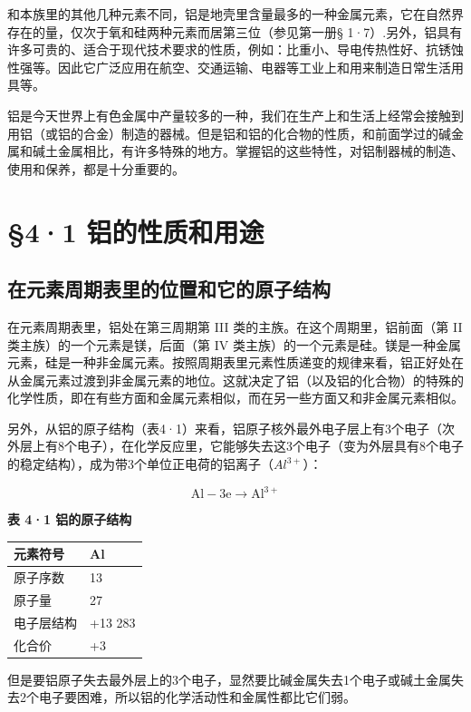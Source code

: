 和本族里的其他几种元素不同，铝是地壳里含量最多的一种金属元素，它在自然界存在的量，仅次于氧和硅两种元素而居第三位（参见第一册§
1·7）.另外，铝具有许多可贵的、适合于现代技术要求的性质，例如：比重小、导电传热性好、抗锈蚀性强等。因此它广泛应用在航空、交通运输、电器等工业上和用来制造日常生活用具等。

铝是今天世界上有色金属中产量较多的一种，我们在生产上和生活上经常会接触到用铝（或铝的合金）制造的器械。但是铝和铝的化合物的性质，和前面学过的碱金属和碱土金属相比，有许多特殊的地方。掌握铝的这些特性，对铝制器械的制造、使用和保养，都是十分重要的。

\section{§4·1 铝的性质和用途}

\subsection{在元素周期表里的位置和它的原子结构}

在元素周期表里，铝处在第三周期第 III 类的主族。在这个周期里，铝前面（第
II 类主族）的一个元素是镁，后面（第 IV
类主族）的一个元素是硅。镁是一种金属元素，硅是一种非金属元素。按照周期表里元素性质递变的规律来看，铝正好处在从金属元素过渡到非金属元素的地位。这就决定了铝（以及铝的化合物）的特殊的化学性质，即在有些方面和金属元素相似，而在另一些方面又和非金属元素相似。

另外，从铝的原子结构（表4·1）来看，铝原子核外最外电子层上有3个电子（次外层上有8个电子），在化学反应里，它能够失去这3个电子（变为外层具有8个电子的稳定结构），成为带3个单位正电荷的铝离子（\(Al^{3+}\)）：

\[
\mathrm{Al} - 3 \mathrm{e} \longrightarrow \mathrm{Al} ^{3+}
\]

\textbf{表 4·1 铝的原子结构}

{\def\LTcaptype{none} %
\begin{longtable}[]{@{}ll@{}}
\toprule\noalign{}
元素符号 & Al \\
\midrule\noalign{}
\endhead
\bottomrule\noalign{}
\endlastfoot
原子序数 & 13 \\
原子量 & 27 \\
电子层结构 & +13 283 \\
化合价 & +3 \\
\end{longtable}
}

但是要铝原子失去最外层上的3个电子，显然要比碱金属失去1个电子或碱土金属失去2个电子要困难，所以铝的化学活动性和金属性都比它们弱。


